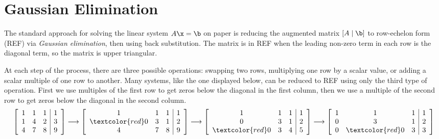 
\section*{Gaussian Elimination} %

The standard approach for solving the linear system $A\x = \b$ on paper is reducing the augmented matrix $\left[A\mid\b\right]$ to row-echelon form (REF) via \emph{Gaussian elimination}, then using back substitution.
The matrix is in REF when the leading non-zero term in each row is the diagonal term, so the matrix is upper triangular.

At each step of the process, there are three possible operations: swapping two rows, multiplying one row by a scalar value, or adding a scalar multiple of one row to another.
Many systems, like the one displayed below, can be reduced to REF using only the third type of operation.
First we use multiples of the first row to get zeros below the diagonal in the first column, then we use a multiple of the second row to get zeros below the diagonal in the second column.
%
\begin{align*}
\left[\begin{array}{ccc|c}
1 & 1 & 1 & 1 \\
1 & 4 & 2 & 3 \\
4 & 7 & 8 & 9 \\
\end{array}\right]
\longrightarrow
\left[\begin{array}{ccc|c}
1 & 1 & 1 & 1 \\
\textcolor{red}0 & 3 & 1 & 2 \\
4 & 7 & 8 & 9 \\
\end{array}\right]
\longrightarrow
\left[\begin{array}{ccc|c}
1 & 1 & 1 & 1 \\
0 & 3 & 1 & 2 \\
\textcolor{red}0 & 3 & 4 & 5 \\
\end{array}\right]
\longrightarrow
\left[\begin{array}{ccc|c}
1 & 1 & 1 & 1 \\
0 & 3 & 1 & 2 \\
0 & \textcolor{red}0 & 3 & 3
\end{array}\right]
\end{align*}

